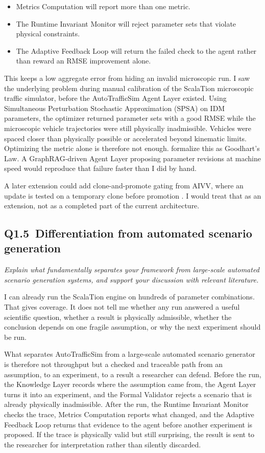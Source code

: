 \begin{bibunit}[plainnat]
\begin{itemize}
    \item Metrics Computation will report more than one metric.
    \item The Runtime Invariant Monitor will reject parameter sets that
    violate physical constraints.
    \item The Adaptive Feedback Loop will return the failed check to the
    agent rather than reward an RMSE improvement alone.
\end{itemize}

This keeps a low aggregate error from hiding an invalid microscopic run. I saw the underlying problem during manual calibration of the ScalaTion
microscopic traffic simulator, before the AutoTrafficSim Agent Layer
existed. Using Simultaneous Perturbation Stochastic Approximation (SPSA) on
IDM parameters, the optimizer returned parameter sets with a good RMSE
while the microscopic vehicle trajectories were still physically
inadmissible. Vehicles were spaced closer than physically possible or
accelerated beyond kinematic limits. Optimizing the metric alone is
therefore not enough. \citet{manheim2019categorizing} formalize this as
Goodhart's Law. A GraphRAG-driven Agent Layer proposing parameter
revisions at machine speed would reproduce that failure faster than I did
by hand.

A later extension could add clone-and-promote gating from AIVV, where an
update is tested on a temporary clone before promotion
\citep{kwon2026aivv}. I would treat that as an extension, not as a
completed part of the current architecture.

\subsection{Q1.5\ Differentiation from automated scenario generation}

\textit{Explain what fundamentally separates your framework from large-scale automated scenario generation systems, and support your discussion with relevant literature.}

I can already run the ScalaTion engine on hundreds of parameter
combinations. That gives coverage. It does not tell me whether any run
answered a useful scientific question, whether a result is physically
admissible, whether the conclusion depends on one fragile assumption, or
why the next experiment should be run.

What separates AutoTrafficSim from a large-scale automated scenario
generator is therefore not throughput but a checked and traceable path
from an assumption, to an experiment, to a result a researcher can
defend. Before the run, the Knowledge Layer records where the assumption
came from, the Agent Layer turns it into an experiment, and the Formal
Validator rejects a scenario that is already physically inadmissible.
After the run, the Runtime Invariant Monitor checks the trace, Metrics
Computation reports what changed, and the Adaptive Feedback Loop returns
that evidence to the agent before another experiment is proposed. If the
trace is physically valid but still surprising, the result is sent to
the researcher for interpretation rather than silently discarded.


\end{bibunit}
